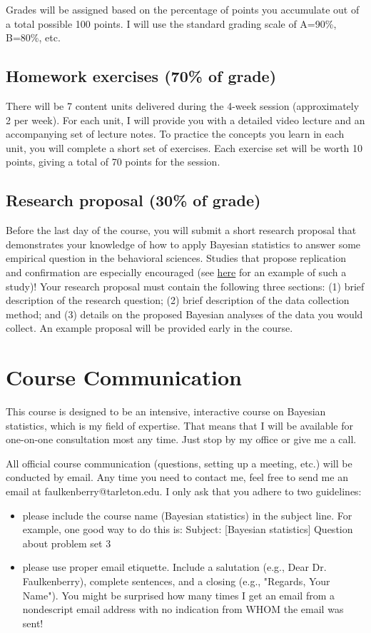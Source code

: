 \documentclass[10pt]{article}
\begin{document}
Grades will be assigned based on the percentage of points you accumulate out of a total possible 100 points.  I will use the standard grading scale of A=90\%, B=80\%, etc.

\subsection*{Homework exercises (70\% of grade)}
\label{sec:org1861aba}
There will be 7 content units delivered during the 4-week session (approximately 2 per week). For each unit, I will provide you with a detailed video lecture and an accompanying set of lecture notes. To practice the concepts you learn in each unit, you will complete a short set of exercises.  Each exercise set will be worth 10 points, giving a total of 70 points for the session.

\subsection*{Research proposal (30\% of grade)}
\label{sec:org33ed9d3}
Before the last day of the course, you will submit a short research proposal that demonstrates your knowledge of how to apply Bayesian statistics to answer some empirical question in the behavioral sciences. Studies that propose replication and confirmation are especially encouraged (see \href{https://psyarxiv.com/5je9u/}{here} for an example of such a study)!  Your research proposal must contain the following three sections: (1) brief description of the research question; (2) brief description of the data collection method; and (3) details on the proposed Bayesian analyses of the data you would collect.  An example proposal will be provided early in the course.  

\section*{Course Communication}
\label{sec:org8b74043}

This course is designed to be an intensive, interactive course on Bayesian statistics, which is my field of expertise.  That means that I will be available for one-on-one consultation most any time.  Just stop by my office or give me a call.

All official course communication (questions, setting up a meeting, etc.) will be conducted by email.  Any time you need to contact me, feel free to send me an email at faulkenberry@tarleton.edu.  I only ask that you adhere to two guidelines:
\begin{itemize}
\item please include the course name (Bayesian statistics) in the subject line.  For example, one good way to do this is:  Subject: [Bayesian statistics] Question about problem set 3
\item please use proper email etiquette.  Include a salutation (e.g., Dear Dr. Faulkenberry), complete sentences, and a closing (e.g., "Regards, Your Name").  You might be surprised how many times I get an email from a nondescript email address with no indication from WHOM the email was sent!
\end{itemize}
\end{document}
